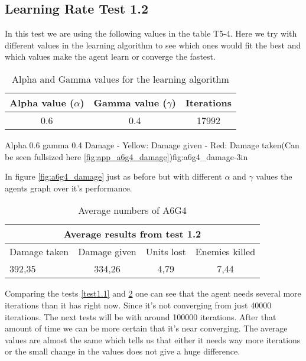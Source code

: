 \subsection*{Learning Rate Test 1.2}
In this test we are using the following values in the table T5-4. Here we try with different values in the learning algorithm to see which ones would fit the best and which values make the agent learn or converge the fastest.


\begin{table}[H]
\begin{centering}

 \begin{tabular}{|c|c|c|}
	\hline
		Alpha value ($\alpha$) & Gamma value ($\gamma$) & Iterations\\
	\hline
		0.6 & 0.4 & 17992 \\
	\hline
\end{tabular}
\label{a6g4_table}
\caption{Alpha and Gamma values for the learning algorithm}
\end{centering}

\end{table}


			{Alpha 0.6 gamma 0.4 Damage - Yellow: Damage given - Red: Damage taken(Can be seen fullsized here \ref{fig:app_a6g4_damage})}{fig:a6g4_damage}{-3in}

In figure \ref{fig:a6g4_damage} just as before but with different $\alpha$ and $\gamma$ values the agents graph over it's performance.






\begin{table}
\begin{centering}

 \begin{tabular}{|l|c|c|c|}
	\multicolumn{4}{c}{Average results from test 1.2} \\
	\hline
		Damage taken & Damage given & Units lost & Enemies killed\\
	\hline
		392,35 & 334,26 & 4,79 & 7,44 \\
	\hline
\end{tabular}
\caption{Average numbers of A6G4}
\label{test1.2}
\end{centering}

\end{table}

Comparing the tests \ref{test1.1} and \ref{test1.2} one can see that the agent needs several more iterations than it has right now. Since it's not converging from just 40000 iterations. The next tests will be with around 100000 iterations. After that amount of time we can be more certain that it's near converging. The average values are almost the same which tells us that either it needs way more iterations or the small change in the values does not give a huge difference.